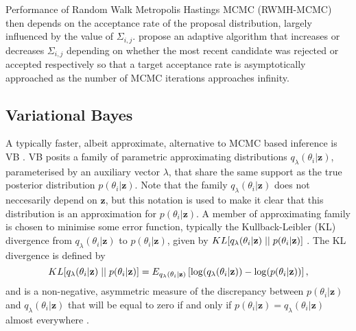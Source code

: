 \documentclass[12pt,a4paper]{article}\usepackage[]{graphicx}\usepackage[]{color}
\begin{document}
Performance of Random Walk Metropolis Hastings MCMC (RWMH-MCMC) then depends on the acceptance rate of the proposal distribution, largely influenced by the value of $\Sigma_{i, j}$. \citet{Garthwaite2016} propose an adaptive algorithm that increases or decreases $\Sigma_{i, j}$ depending on whether the most recent candidate was rejected or accepted respectively so that a target acceptance rate is asymptotically approached as the number of MCMC iterations approaches infinity.

\subsection{Variational Bayes}
\label{subsec:VB}

A typically faster, albeit approximate, alternative to MCMC based inference is VB \citep{Jordan1999}. VB posits a family of parametric approximating distributions $q_{\lambda}(\theta_i | \textbf{z})$, parameterised by an auxiliary vector $\lambda$, that share the same support as the true posterior distribution $p(\theta_i | \textbf{z})$. Note that the family $q_{\lambda}(\theta_i | \textbf{z})$ does not neccesarily depend on $\textbf{z}$, but this notation is used to make it clear that this distribution is an approximation for $p(\theta_i | \textbf{z})$. A member of approximating family is chosen to minimise some error function, typically the Kullback-Leibler (KL) divergence from $q_{\lambda}(\theta_i | \textbf{z})$ to $p(\theta_i | \textbf{z})$, given by $KL[q_{\lambda}(\theta_i | \textbf{z})\hspace{.1cm}||\hspace{.1cm}p(\theta_i | \textbf{z})]$ \citep{Kullback1951}. The KL divergence is defined by
\begin{equation}
\label{KL-def}
KL[q_{\lambda}(\theta_i | \textbf{z})\hspace{.1cm}||\hspace{.1cm}p(\theta_i | \textbf{z})] = E_{q_{\lambda}(\theta_i | \textbf{z})} \left[ \log(q_{\lambda}(\theta_i | \textbf{z})) - \log(p(\theta_i | \textbf{z})) \right],
\end{equation}
and is a non-negative, asymmetric measure of the discrepancy between $p(\theta_i | \textbf{z})$ and $q_{\lambda}(\theta_i | \textbf{z})$  that will be equal to zero if and only if $p(\theta_i | \textbf{z}) = q_{\lambda}(\theta_i | \textbf{z})$ almost everywhere \citep{Bishop2006}.
\\
\end{document}
